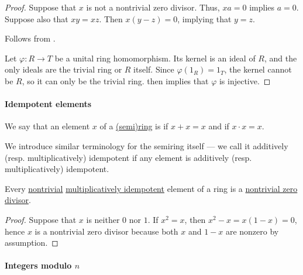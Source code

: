 \begin{proof}
  \NecessitySubProof* Suppose that \( x \) is not a nontrivial zero divisor. Thus, \( xa = 0 \) implies \( a = 0 \). Suppose also that \( xy = xz \). Then \( x(y - z) = 0 \), implying that \( y = z \).

   Follows from .

   Let \( \varphi: R \to T \) be a unital ring homomorphism. Its kernel is an ideal of \( R \), and the only ideals are the trivial ring or \( R \) itself. Since \( \varphi(1_R) = 1_T \), the kernel cannot be \( R \), so it can only be the trivial ring.  then implies that \( \varphi \) is injective.
\end{proof}

\paragraph{Idempotent elements}

\begin{definition}\label{def:semiring_idempotent}
  We say that an element \( x \) of a \hyperref[def:semiring]{(semi)ring} is  if \( x + x = x \) and  if \( x \cdot x = x \).

  We introduce similar terminology for the semiring itself --- we call it additively (resp. multiplicatively) idempotent if any element is additively (resp. multiplicatively) idempotent.
\end{definition}

\begin{proposition}\label{thm:idempotent_division}
  Every \hyperref[def:monoid_idempotent]{nontrivial} \hyperref[def:semiring_idempotent]{multiplicatively idempotent} element of a ring is a \hyperref[def:divisibility/zero]{nontrivial zero divisor}.
\end{proposition}
\begin{proof}
  Suppose that \( x \) is neither \( 0 \) nor \( 1 \). If \( x^2 = x \), then \( x^2 - x = x(1 - x) = 0 \), hence \( x \) is a nontrivial zero divisor because both \( x \) and \( 1 - x \) are nonzero by assumption.
\end{proof}

\paragraph{Integers modulo \( n \)}

